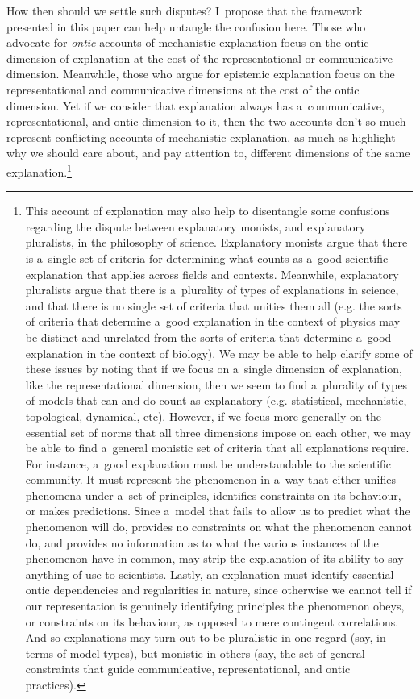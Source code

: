 How then should we settle such disputes? I~propose that the framework presented in this paper can help untangle the confusion here. Those who advocate for \textit{ontic} accounts of mechanistic explanation focus on the ontic dimension of explanation at the cost of the representational or communicative dimension. Meanwhile, those who argue for epistemic explanation focus on the representational and communicative dimensions at the cost of the ontic dimension. Yet if we consider that explanation always has a~communicative, representational, and ontic dimension to it, then the two accounts don't so much represent conflicting accounts of mechanistic explanation, as much as highlight why we should care about, and pay attention to, different dimensions of the same explanation.\footnote{This account of explanation may also help to disentangle some confusions regarding the dispute between explanatory monists, and explanatory pluralists, in the philosophy of science. Explanatory monists argue that there is a~single set of criteria for determining what counts as a~good scientific explanation that applies across fields and contexts. Meanwhile, explanatory pluralists argue that there is a~plurality of types of explanations in science, and that there is no single set of criteria that unities them all (e.g. the sorts of criteria that determine a~good explanation in the context of physics may be distinct and unrelated from the sorts of criteria that determine a~good explanation in the context of biology). We may be able to help clarify some of these issues by noting that if we focus on a~single dimension of explanation, like the representational dimension, then we seem to find a~plurality of types of models that can and do count as explanatory (e.g. statistical, mechanistic, topological, dynamical, etc). However, if we focus more generally on the essential set of norms that all three dimensions impose on each other, we may be able to find a~general monistic set of criteria that all explanations require. For instance, a~good explanation must be understandable to the scientific community. It must represent the phenomenon in a~way that either unifies phenomena under a~set of principles, identifies constraints on its behaviour, or makes predictions. Since a~model that fails to allow us to predict what the phenomenon will do, provides no constraints on what the phenomenon cannot do, and provides no information as to what the various instances of the phenomenon have in common, may strip the explanation of its ability to say anything of use to scientists. Lastly, an explanation must identify essential ontic dependencies and regularities in nature, since otherwise we cannot tell if our representation is genuinely identifying principles the phenomenon obeys, or constraints on its behaviour, as opposed to mere contingent correlations. And so explanations may turn out to be pluralistic in one regard (say, in terms of model types), but monistic in others (say, the set of general constraints that guide communicative, representational, and ontic practices).}

